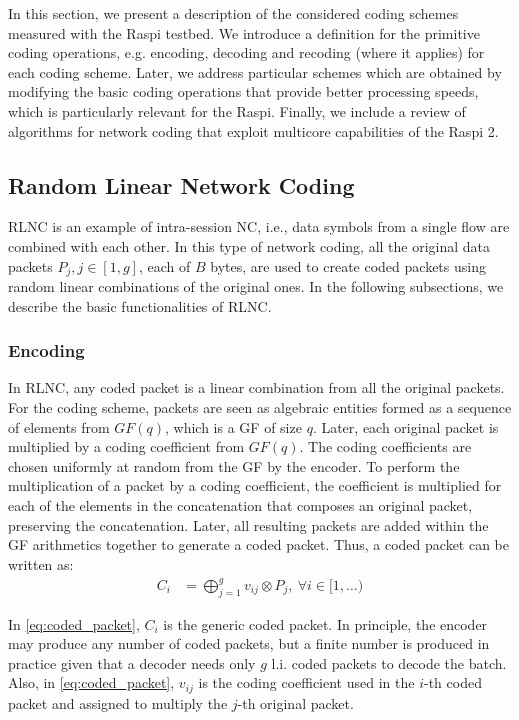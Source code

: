 \label{sec:schemes}

In this section, we present a description of the considered coding
schemes measured with the \ac{Raspi} testbed. We introduce a
definition for the primitive coding operations, e.g. encoding,
decoding and recoding (where it applies) for each coding
scheme. Later, we address particular schemes which are obtained by
modifying the basic coding operations that provide better processing
speeds, which is particularly relevant for the \ac{Raspi}.  Finally,
we include a review of algorithms for network coding that exploit
multicore capabilities of the \ac{Raspi} 2.


\subsection{Random Linear Network Coding}
\label{ssec:RLNC}

\ac{RLNC} is an example of intra-session \ac{NC}, i.e., data symbols
from a single flow are combined with each other. In this type of
network coding, all the original data packets $P_j, j \in [1,g]$, each
of $B$ bytes, are used to create coded packets using random linear
combinations of the original ones. In the following subsections, we
describe the basic functionalities of \ac{RLNC}.

\subsubsection{Encoding}
In \ac{RLNC}, any coded packet is a linear combination from all
the original packets. For the coding scheme, packets are seen as
algebraic entities formed as a sequence of elements from $GF(q)$,
which is a \ac{GF} of size $q$. Later, each original packet is
multiplied by a coding coefficient from $GF(q)$. The coding coefficients
are chosen uniformly at random from the \ac{GF} by the encoder. To
perform the multiplication of a packet by a coding coefficient, the
coefficient is multiplied for each of the elements in the
concatenation that composes an original packet, preserving the
concatenation. Later, all resulting packets are added within the
\ac{GF} arithmetics together to generate a coded packet. Thus, a
coded packet can be written as:
%
\begin{align} \label{eq:coded_packet}
C_i  &= \bigoplus_{j=1}^{g} v_{ij} \otimes P_j ,\ \forall i \in [1,\ldots)
\end{align}

In \eqref{eq:coded_packet}, $C_i$ is the generic coded packet. In principle,
the encoder may produce any number of coded packets, but a finite
number is produced in practice given that a decoder needs only
$g$ \ac{l.i.} coded packets to decode the batch. Also, in
\eqref{eq:coded_packet}, $v_{ij}$ is the coding coefficient used in the
$i$-th coded packet and assigned to multiply the $j$-th original packet.

